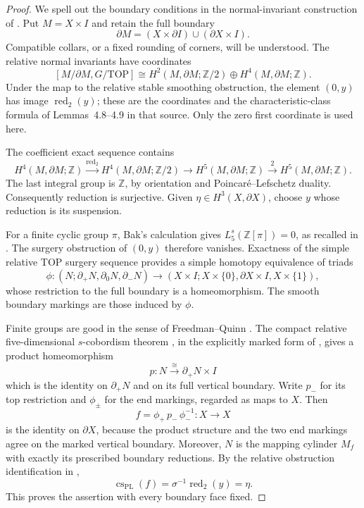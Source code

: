 \begin{proof}
We spell out the boundary conditions in the normal-invariant
construction of
\cite[Section~4.2 and proof of Theorem~1.7, pp.~2524--2528]{Galvin2026CassonSullivan}.
Put $M=X\times I$ and retain the full boundary
\[
 \partial M=(X\times\partial I)\cup(\partial X\times I).
\]
Compatible collars, or a fixed rounding of corners, will be
understood.  The relative normal invariants have coordinates
\begin{equation}\label{eq:cyclic-relative-normal-coordinates}
 [M/\partial M,G/\mathrm{TOP}]
 \cong H^2(M,\partial M;\mathbb Z/2)
                  \oplus H^4(M,\partial M;\mathbb Z).
\end{equation}
Under the map to the relative stable smoothing obstruction,
the element $(0,y)$ has image $\operatorname{red}_2(y)$;
these are the coordinates and the characteristic-class formula
of Lemmas~4.8--4.9 in that source.  Only the zero first
coordinate is used here.

The coefficient exact sequence contains
\[
 H^4(M,\partial M;\mathbb Z)\xrightarrow{\operatorname{red}_2}
 H^4(M,\partial M;\mathbb Z/2)\longrightarrow
 H^5(M,\partial M;\mathbb Z)\xrightarrow{\,2\,}
 H^5(M,\partial M;\mathbb Z).
\]
The last integral group is $\mathbb Z$, by orientation and
Poincar\'e--Lefschetz duality.  Consequently reduction is
surjective.  Given $\eta\in H^3(X,\partial X)$, choose $y$
whose reduction is its suspension.

For a finite cyclic group $\pi$, Bak's calculation gives
$L_5^s(\mathbb Z[\pi])=0$, as recalled in
\cite[Section~4.4, p.~2528]{Galvin2026CassonSullivan}.
The surgery obstruction of $(0,y)$ therefore vanishes.
Exactness of the simple relative TOP surgery sequence
\cite[Theorem~11.3A and the simple-structure convention, p.~200]{FreedmanQuinn1990}
provides a simple homotopy equivalence of triads
\[
 \phi:(N;\partial_+N,\partial_0N,\partial_-N)
 \longrightarrow
 (X\times I;X\times\{0\},\partial X\times I,X\times\{1\}),
\]
whose restriction to the full boundary is a homeomorphism.
The smooth boundary markings are those induced by $\phi$.

Finite groups are good in the sense of Freedman--Quinn
\cite[p.~99]{FreedmanQuinn1990}.  The compact relative
five-dimensional $s$-cobordism theorem
\cite[Theorem~7.1A, p.~101]{FreedmanQuinn1990}, in the explicitly
marked form of
\cite[Proposition~4.10, pp.~2526--2527]{Galvin2026CassonSullivan},
gives a product homeomorphism
\[
 p:N\xrightarrow{\cong}\partial_+N\times I
\]
which is the identity on $\partial_+N$ and on its full vertical
boundary.  Write $p_-$ for its top restriction and $\phi_\pm$
for the end markings, regarded as maps to $X$.  Then
\[
 f=\phi_+\,p_-\,\phi_-^{-1}:X\longrightarrow X
\]
is the identity on $\partial X$, because the product structure
and the two end markings agree on the marked vertical boundary.
Moreover, $N$ is the mapping cylinder $M_f$ with exactly its
prescribed boundary reductions.  By the relative obstruction
identification in
\cite[Lemma~4.12, p.~2527]{Galvin2026CassonSullivan},
\[
 \operatorname{cs}_{\mathrm{PL}}(f)
   =\sigma^{-1}\operatorname{red}_2(y)=\eta.
\]
This proves the assertion with every boundary face fixed.
\end{proof}

